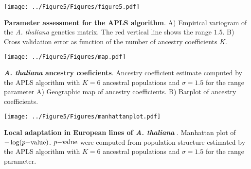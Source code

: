 \clearpage 
\newpage

\begin{center}
\texttt{[image: ../Figure5/Figures/figure5.pdf]}
\end{center}
 {\bf Parameter assessment for the APLS algorithm}. A) Empirical variogram of the {\it A. thaliana} genetics matrix. The red vertical line shows the range $1.5$. B) Cross validation error as function of the number of ancestry coefficients $K$.

\clearpage 
\newpage

\begin{center}
\texttt{[image: ../Figure5/Figures/map.pdf]}
\end{center}
 {\bf {\it A. thaliana} ancestry coeficients}. Ancestry coefficient estimate computed by the APLS algorithm with $K=6$ ancestral populations and $\sigma = 1.5$ for the range parameter A) Geographic map of ancestry coefficients. B) Barplot of ancestry coefficients.

\clearpage 
\newpage

\begin{center}
\texttt{[image: ../Figure5/Figures/manhattanplot.pdf]}
\end{center}
 {\bf Local adaptation in European lines of \bf {\it A.  thaliana} }. Manhattan plot of $-\log(p{\rm -value})$.  $p{\rm -value}$ were computed from population structure estimated by the APLS algorithm with $K=6$ ancestral populations and $\sigma = 1.5$ for the range parameter.



